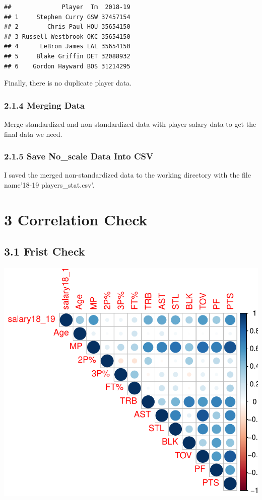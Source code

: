 \documentclass[]{article}
\begin{document}
\begin{verbatim}
##              Player  Tm  2018-19
## 1     Stephen Curry GSW 37457154
## 2        Chris Paul HOU 35654150
## 3 Russell Westbrook OKC 35654150
## 4      LeBron James LAL 35654150
## 5     Blake Griffin DET 32088932
## 6    Gordon Hayward BOS 31214295
\end{verbatim}

Finally, there is no duplicate player data.

\subsubsection{2.1.4 Merging Data}\label{merging-data}

Merge standardized and non-standardized data with player salary data to
get the final data we need.

\subsubsection{2.1.5 Save No\_scale Data Into
CSV}\label{save-no_scale-data-into-csv}

I saved the merged non-standardized data to the working directory with
the file name'18-19 players\_stat.csv'.

\section{3 Correlation Check}\label{correlation-check}

\subsection{3.1 Frist Check}\label{frist-check}

\includegraphics{Final_Report_files/figure-latex/unnamed-chunk-11-1.pdf}
\end{document}
